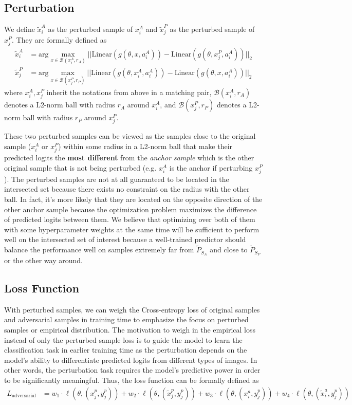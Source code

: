 \documentclass{article}
\begin{document}
\subsection{Perturbation}
We define $\tilde{x}_i^A$ as the perturbed sample of $x_i^A$ and $\tilde{x}_j^P$ as the perturbed 
sample of $x_j^P$. They are formally defined as 
\begin{align*}
  \tilde{x}_i^A &= \text{arg} \max_{x \in \mathcal{B}(x_i^A, r_A)} ||\text{Linear}(g(\theta, x, a_i^A)) - 
  \text{Linear}(g(\theta, x_j^P, a_i^A))||_2
  \\ \tilde{x}_j^P &= \text{arg} \max_{x \in \mathcal{B}(x_j^P, r_P)} ||\text{Linear}(g(\theta, x_i^A, a_i^A)) - 
  \text{Linear}(g(\theta, x, a_i^A))||_2
\end{align*}
where $x_i^A, x_j^P$ inherit the notations from above in a matching pair,
$\mathcal{B}(x_i^A, r_A)$ denotes a L2-norm ball with radius $r_A$ around $x_i^A$, 
and $\mathcal{B}(x_j^P, r_P)$ denotes a L2-norm ball with radius $r_P$ around $x_j^P$.

These two perturbed samples can be viewed as the samples close to the original sample ($x^A_i$ or $x^P_j$)
within some radius in a L2-norm ball that make their predicted logits the \textbf{most different} 
from the \textit{anchor sample} which is the other original sample that is not being perturbed (e.g. $x^A_i$ is the anchor if perturbing $x^P_j$). 
The perturbed samples are not at all guaranteed to be located in the intersected set because 
there exists no constraint on the radius with the other ball. In fact, it's more likely that they are located on 
the opposite direction of the other anchor sample because the optimization problem 
maximizes the difference of predicted logits between them. We believe that optimizing 
over both of them with some hyperparameter weights at the same time will be sufficient to 
perform well on the intersected set of interest because a well-trained predictor should 
balance the performance well on samples extremely far from $\tilde{P}_{S_A}$ and close 
to $\tilde{P}_{S_P}$ or the other way around.

\subsection{Loss Function}
With perturbed samples, we can weigh the Cross-entropy loss of original samples and 
adversarial samples in training time to emphasize the focus on perturbed samples 
or empirical distribution. The motivation to weigh in the empirical loss instead of 
only the perturbed sample loss is to guide the model to learn the classification 
task in earlier training time as the perturbation depends on the model's ability 
to differentiate predicted logits from different types of images. In other words,
the perturbation task requires the model's predictive power in order to be 
significantly meaningful. Thus, the loss function can be formally defined as
\begin{align*}
  L_{\text{adversarial}} &= w_1 \cdot \ell(\theta, (x_j^p, y_j^p)) + w_2 \cdot \ell(\theta, (\tilde{x}_j^p, y_j^p))
    + w_3 \cdot \ell(\theta, (x_i^a, y_j^p)) + w_4 \cdot \ell(\theta, (\tilde{x}_i^a, y_j^p))
\end{align*}
\end{document}
